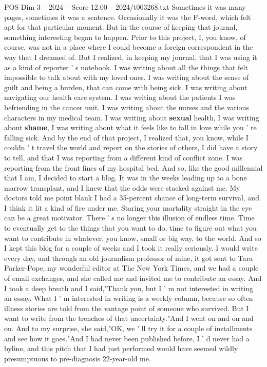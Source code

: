 \begin{textsample}{POS Dim 3 – 2024 – Score 12.00 – 2024/t003268.txt}
Sometimes it was many pages, sometimes it was a sentence.
Occasionally it was the F-word, which felt apt for that particular moment.
But in the course of keeping that journal, something interesting began to happen.
Prior to this project, I, you know, of course, was not in a place where I could become a foreign correspondent in the way that I dreamed of.
But I realized, in keeping my journal, that I was using it as a kind of reporter ' s notebook.
I was writing about all the things that felt impossible to talk about with my loved ones.
I was writing about the sense of guilt and being a burden, that can come with being sick.
I was writing about navigating our health care system.
I was writing about the patients I was befriending in the cancer unit.
I was writing about the nurses and the various characters in my medical team.
I was writing about \textbf{sexual} health, I was writing about \textbf{shame}, I was writing about what it feels like to fall in love while you ' re falling sick.
And by the end of that project, I realized that, you know, while I couldn ' t travel the world and report on the stories of others, I did have a story to tell, and that I was reporting from a different kind of conflict zone.
I was reporting from the front lines of my hospital bed.
And so, like the good millennial that I am, I decided to start a blog.
It was in the weeks leading up to a bone marrow transplant, and I knew that the odds were stacked against me.
My doctors told me point blank I had a 35-percent chance of long-term survival, and I think it lit a kind of fire under me.
Staring your mortality straight in the eye can be a great motivator.
There ' s no longer this illusion of endless time.
Time to eventually get to the things that you want to do, time to figure out what you want to contribute in whatever, you know, small or big way, to the world.
And so I kept this blog for a couple of weeks and I took it really seriously.
I would write every day, and through an old journalism professor of mine, it got sent to Tara Parker-Pope, my wonderful editor at The New York Times, and we had a couple of email exchanges, and she called me and invited me to contribute an essay.
And I took a deep breath and I said,"Thank you, but I ' m not interested in writing an essay.
What I ' m interested in writing is a weekly column, because so often illness stories are told from the vantage point of someone who survived.
But I want to write from the trenches of that uncertainty."And I went on and on and on.
And to my surprise, she said,"OK, we ' ll try it for a couple of installments and see how it goes."And I had never been published before, I ' d never had a byline, and this pitch that I had just performed would have seemed wildly presumptuous to pre-diagnosis 22-year-old me.

\end{textsample}
